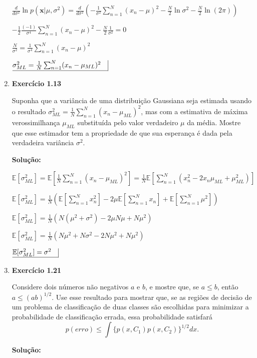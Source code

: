 \begin{enumerate}
$\frac{d}{d\sigma^2}\ln p (\boldsymbol{x}|\mu, \sigma^2) = \frac{d}{d\sigma^2}\left( -\frac{1}{\sigma^2}\sum_{n=1}^{N}(x_n-\mu)^2-\frac{N}{2}\ln \sigma^2 - \frac{N}{2}\ln (2\pi) \right)$

$-\frac{1}{2}\frac{(-1)}{\sigma^4} \sum_{n=1}^{N}(x_n-\mu)^2 - \frac{N}{2}\frac{1}{\sigma^2} = 0 $

$ \frac{N}{\sigma^2}  = \frac{1}{\sigma^4} \sum_{n=1}^{N}(x_n-\mu)^2 $

$ \underline{\sigma_{ML}^2 = \frac{1}{N} \sum_{n=1}^{N}(x_n - \mu_{ML})^2 \quad} \vline $

\item \textbf{Exercício 1.13} \par

Suponha que a variância de uma distribuição Gaussiana seja estimada usando o resultado $\sigma_{ML}^2=\frac{1}{N}\sum_{n=1}^{N}(x_n-\mu_{ML})^2$, mas com a estimativa de máxima verossimilhança $\mu_{ML}$ substituída pelo valor verdadeiro $\mu$ da média. Mostre que esse estimador tem a propriedade de que sua esperança é dada pela verdadeira variância $\sigma^2$.
\newline \par
\textbf{Solução:}


$\mathbb{E}[\sigma_{ML}^2]=\mathbb{E}[\frac{1}{N}\sum_{n=1}^{N}(x_n-\mu_{ML})^2] = \frac{1}{N}\mathbb{E}[\sum_{n=1}^{N} \left( x_n^2 - 2 x_n \mu_{ML} + \mu_{ML}^2 \right) ]$

$\mathbb{E}[\sigma_{ML}^2]=\frac{1}{N} \left(\mathbb{E}[\sum_{n=1}^{N}x_n^2]-2\mu\mathbb{E}[\sum_{n=1}^{N}x_n]+\mathbb{E}[\sum_{n=1}^{N} \mu^2]\right) $

$\mathbb{E}[\sigma_{ML}^2]=\frac{1}{N} \left(  N(\mu^2+\sigma^2) -2\mu N \mu + N \mu^2 \right) $

$\mathbb{E}[\sigma_{ML}^2]=\frac{1}{N} \left(  N\mu^2+N\sigma^2 - 2N \mu^2 + N \mu^2 \right) $

$ \underline{\mathbb{E}[\sigma_{ML}^2] = \sigma^2 \quad} \vline $

\item \textbf{Exercício 1.21} \par

Considere dois números não negativos $a$ e $b$, e mostre que, se $a\leq b$, então $a \leq (ab)^{1/2}$. Use esse resultado para mostrar que, se as regiões de decisão de um problema de classificação de duas classes são escolhidas para minimizar a probabilidade de classificação errada, essa probabilidade satisfará
\begin{equation*}
    p(erro) \leq \int \{p(x,C_1)p(x,C_2)\}^{1/2}dx.
\end{equation*}
\newline \par
\textbf{Solução:}



\end{enumerate}
